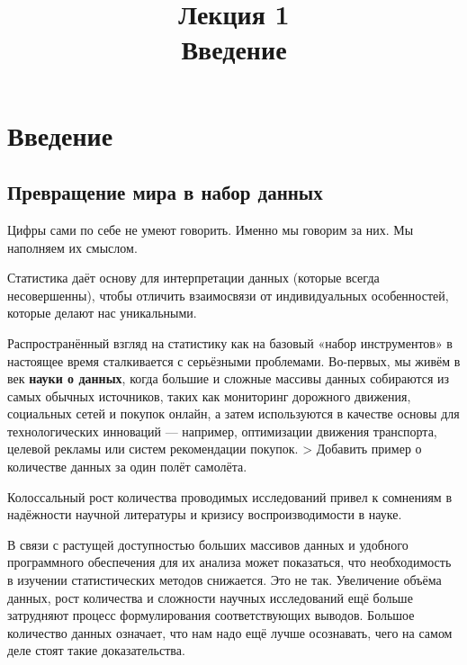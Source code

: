 \documentclass[11pt,a4paper]{article}
\title{
    {\Large Лекция 1} \\
    Введение
  }
\begin{document}
    
\maketitle
\tableofcontents
\pagebreak


    \hypertarget{ux432ux432ux435ux434ux435ux43dux438ux435}{%
\section{Введение}\label{ux432ux432ux435ux434ux435ux43dux438ux435}}

\hypertarget{ux43fux440ux435ux432ux440ux430ux449ux435ux43dux438ux435-ux43cux438ux440ux430-ux432-ux43dux430ux431ux43eux440-ux434ux430ux43dux43dux44bux445}{%
\subsection{Превращение мира в набор
данных}\label{ux43fux440ux435ux432ux440ux430ux449ux435ux43dux438ux435-ux43cux438ux440ux430-ux432-ux43dux430ux431ux43eux440-ux434ux430ux43dux43dux44bux445}}

Цифры сами по себе не умеют говорить. Именно мы говорим за них. Мы
наполняем их смыслом.

Статистика даёт основу для интерпретации данных (которые всегда
несовершенны), чтобы отличить взаимосвязи от индивидуальных
особенностей, которые делают нас уникальными.

Распространённый взгляд на статистику как на базовый «набор
инструментов» в настоящее время сталкивается с серьёзными проблемами.
Во-первых, мы живём в век \textbf{науки о данных}, когда большие и
сложные массивы данных собираются из самых обычных источников, таких как
мониторинг дорожного движения, социальных сетей и покупок онлайн, а
затем используются в качестве основы для технологических инноваций ---
например, оптимизации движения транспорта, целевой рекламы или систем
рекомендации покупок. \textgreater{} Добавить пример о количестве данных
за один полёт самолёта.

Колоссальный рост количества проводимых исследований привел к сомнениям
в надёжности научной литературы и кризису воспроизводимости в науке.

В связи с растущей доступностью больших массивов данных и удобного
программного обеспечения для их анализа может показаться, что
необходимость в изучении статистических методов снижается. Это не так.
Увеличение объёма данных, рост количества и сложности научных
исследований ещё больше затрудняют процесс формулирования
соответствующих выводов. Большое количество данных означает, что нам
надо ещё лучше осознавать, чего на самом деле стоят такие
доказательства.
\end{document}

